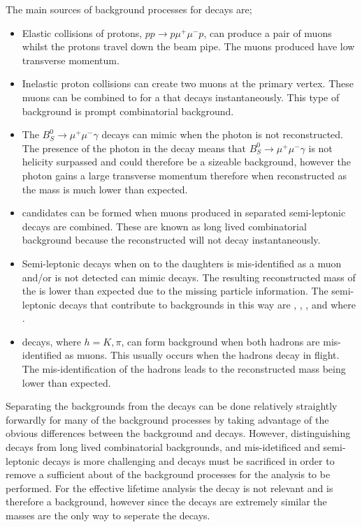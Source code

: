 The main sources of background processes for \bsmumu decays are;
\begin{itemize}
\item Elastic collisions of protons, $pp \to p \mu^+{} \mu^{-} p$, can produce a pair of muons whilst the protons travel down the beam pipe. The muons produced have low transverse momentum.
\item Inelastic proton collisions can create two muons at the primary vertex. These muons can be combined to for a \bs that decays instantaneously. This type of background is prompt  combinatorial background. 
\item The $B_{S}^{0}\to\mu^{+}\mu^{-}\gamma$ decays can mimic \bsmumu when the photon is not reconstructed. The presence of the photon in the decay means that $B_{S}^{0}\to\mu^{+}\mu^{-}\gamma$ is not helicity surpassed and could therefore be a sizeable background, however the photon gains a large transverse momentum therefore when reconstructed as \bsmumu the \bs mass is much lower than expected.
\item \bsmumu candidates can be formed when muons produced in separated semi-leptonic decays are combined. These are known as long lived combinatorial background because the reconstructed \bs will not decay instantaneously.
\item Semi-leptonic decays when on to the daughters is mis-identified as a muon and/or is not detected can mimic \bsmumu decays. The resulting reconstructed mass of the \bs is lower than expected due to the missing particle information. The semi-leptonic decays that contribute to \bsmumu backgrounds in this way are \bdpimunu, \bsKmunu, \bpimumu, \bdpimumu and \bcjpsimunu where \jpsimumu.
\item \bhh decays, where $ h  = K, \pi$, can form background when both hadrons are mis-identified as muons. This usually occurs when the hadrons decay in flight. The mis-identification of the hadrons leads to the reconstructed \bs mass being lower than expected.
\end{itemize}

Separating the backgrounds from the \bsmumu decays can be done relatively straightly forwardly for many of the background processes by taking advantage of the obvious differences between the background and \bsmumu decays. However, distinguishing \bsmumu decays from long lived combinatorial backgrounds, and mis-idetificed \bhh and semi-leptonic decays is more challenging and \bsmumu decays must be sacrificed in order to remove a sufficient about of the background processes for the analysis to be performed. For the effective lifetime analysis the \bdmumu decay is not relevant and is therefore a background, however since the decays are extremely similar the \bsd masses are the only way to seperate the decays.

